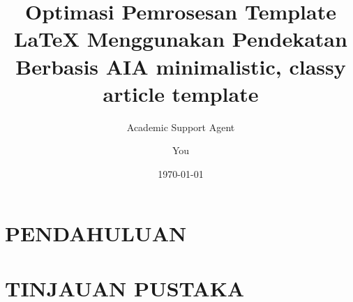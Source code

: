 \documentclass{template}
\title{Optimasi Pemrosesan Template LaTeX Menggunakan Pendekatan Berbasis AI}
\author{Academic Support Agent}
\date{\today}
\begin{document}
\maketitle

\begin{abstract}

\end{abstract}

\chapter{PENDAHULUAN}


\chapter{TINJAUAN PUSTAKA}



\usepackage[english]{babel}

\usepackage{amsmath}
\usepackage{graphicx}
\usepackage[colorinlistoftodos]{todonotes}

\title{A minimalistic, classy article template}
\author{You}
\end{document}
